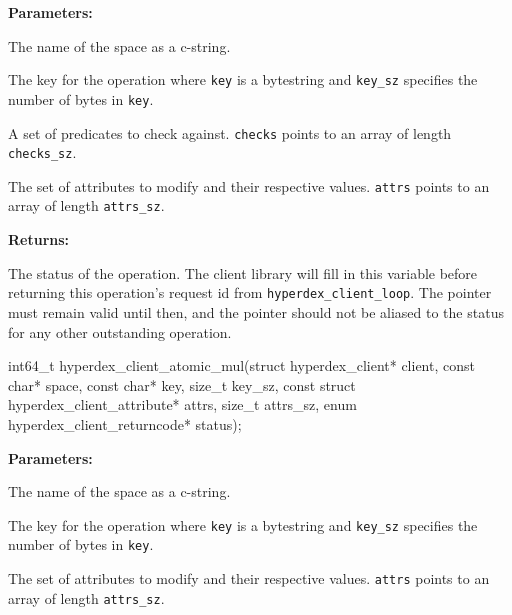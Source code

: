 \noindent\textbf{Parameters:}
\begin{description}[labelindent=\widthof{{\texttt{checks}, \texttt{checks\_sz}}},leftmargin=*,noitemsep,nolistsep,align=right]
\item[\texttt{space}] The name of the space as a c-string.
\item[\texttt{key}, \texttt{key\_sz}] The key for the operation where \texttt{key} is a bytestring and \texttt{key\_sz} specifies the number of bytes in \texttt{key}.
\item[\texttt{checks}, \texttt{checks\_sz}] A set of predicates to check against.  \texttt{checks} points to an array of length \texttt{checks\_sz}.
\item[\texttt{attrs}, \texttt{attrs\_sz}] The set of attributes to modify and their respective values.  \texttt{attrs} points to an array of length \texttt{attrs\_sz}.
\end{description}

\noindent\textbf{Returns:}
\begin{description}[labelindent=\widthof{{\texttt{status}}},leftmargin=*,noitemsep,nolistsep,align=right]
\item[\texttt{status}] The status of the operation.  The client library will fill in this variable before returning this operation's request id from \texttt{hyperdex\_client\_loop}.  The pointer must remain valid until then, and the pointer should not be aliased to the status for any other outstanding operation.
\end{description}

\funcsep
\begin{ccode}
int64_t hyperdex_client_atomic_mul(struct hyperdex_client* client,
                const char* space,
                const char* key, size_t key_sz,
                const struct hyperdex_client_attribute* attrs, size_t attrs_sz,
                enum hyperdex_client_returncode* status);
\end{ccode}
\funcdesc 

\noindent\textbf{Parameters:}
\begin{description}[labelindent=\widthof{{\texttt{attrs}, \texttt{attrs\_sz}}},leftmargin=*,noitemsep,nolistsep,align=right]
\item[\texttt{space}] The name of the space as a c-string.
\item[\texttt{key}, \texttt{key\_sz}] The key for the operation where \texttt{key} is a bytestring and \texttt{key\_sz} specifies the number of bytes in \texttt{key}.
\item[\texttt{attrs}, \texttt{attrs\_sz}] The set of attributes to modify and their respective values.  \texttt{attrs} points to an array of length \texttt{attrs\_sz}.
\end{description}

